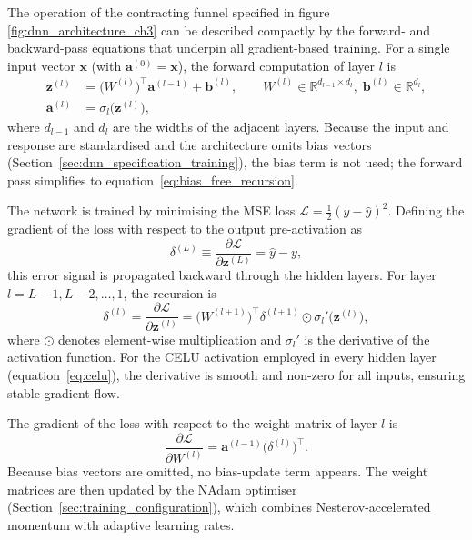 The operation of the contracting funnel specified in figure
\ref{fig:dnn_architecture_ch3} can be described compactly by the
forward- and backward-pass equations that underpin all gradient-based
training.  For a single input vector $\mathbf{x}$ (with
$\mathbf{a}^{(0)} = \mathbf{x}$), the forward computation of layer $l$ is
\begin{align}
    \mathbf{z}^{(l)} &= \bigl(W^{(l)}\bigr)^{\!\top} \mathbf{a}^{(l-1)}
                      + \mathbf{b}^{(l)},
                      \qquad
                      W^{(l)} \in \mathbb{R}^{d_{l-1}\times d_{l}},\;
                      \mathbf{b}^{(l)} \in \mathbb{R}^{d_{l}},
    \label{eq:forward_affine} \\
    \mathbf{a}^{(l)} &= \sigma_l\!\bigl(\mathbf{z}^{(l)}\bigr),
    \label{eq:forward_activation}
\end{align}
where $d_{l-1}$ and $d_{l}$ are the widths of the adjacent layers.
Because the input and response are standardised and the architecture omits
bias vectors (Section~\ref{sec:dnn_specification_training}), the bias term
is not used; the forward pass simplifies to
equation~\eqref{eq:bias_free_recursion}.

The network is trained by minimising the MSE loss
$\mathcal{L} = \frac{1}{2}(y - \hat{y})^{2}$.  Defining the gradient of the
loss with respect to the output pre-activation as
\begin{equation}
    \delta^{(L)} \equiv \frac{\partial \mathcal{L}}{\partial \mathbf{z}^{(L)}}
    = \hat{y} - y,
    \label{eq:output_delta}
\end{equation}
this error signal is propagated backward through the hidden layers.  For
layer $l = L-1, L-2, \dots, 1$, the recursion is
\begin{equation}
    \delta^{(l)}
    = \frac{\partial \mathcal{L}}{\partial \mathbf{z}^{(l)}}
    = \bigl(W^{(l+1)}\bigr)^{\!\top} \delta^{(l+1)}
      \odot \sigma_{l}'\!\bigl(\mathbf{z}^{(l)}\bigr),
    \label{eq:backprop_delta}
\end{equation}
where $\odot$ denotes element-wise multiplication and $\sigma_{l}'$ is the
derivative of the activation function.  For the CELU activation
employed in every hidden layer (equation~\eqref{eq:celu}), the derivative is
smooth and non-zero for all inputs, ensuring stable gradient flow.

The gradient of the loss with respect to the weight matrix of layer $l$ is
\begin{equation}
    \frac{\partial \mathcal{L}}{\partial W^{(l)}}
    = \mathbf{a}^{(l-1)} \bigl(\delta^{(l)}\bigr)^{\!\top}.
    \label{eq:weight_gradient}
\end{equation}
Because bias vectors are omitted, no bias-update term appears.  The weight
matrices are then updated by the NAdam optimiser
(Section~\ref{sec:training_configuration}), which combines Nesterov-accelerated momentum with adaptive learning rates.

